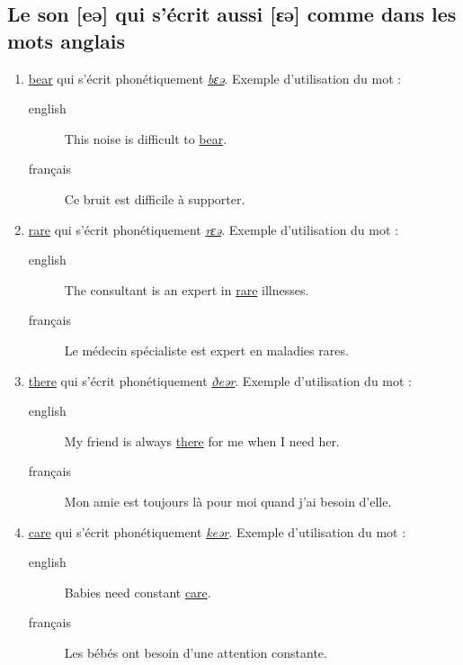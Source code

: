 \subsection{Le son [eə] qui s'écrit aussi [ɛə] comme dans les mots anglais}
\label{sec:org0206cfe}
\begin{enumerate}
\item \href{http://www.wordreference.com/enfr/bear}{bear} qui s'écrit phonétiquement \href{https://dictionary.cambridge.org/dictionary/english/bear}{\emph{bɛə}}. Exemple d'utilisation du mot :
\begin{description}
\item[{english}] \textenglish{This noise is difficult to \href{https://youtu.be/NJ6jv\_lPBN8}{bear}.}
\item[{français}] Ce bruit est difficile à supporter.
\end{description}
\item \href{http://www.wordreference.com/enfr/rare}{rare} qui s'écrit phonétiquement \href{https://dictionary.cambridge.org/dictionary/english/rare}{\emph{rɛə}}. Exemple d'utilisation du mot :
\begin{description}
\item[{english}] \textenglish{The consultant is an expert in \href{https://youtu.be/hPncU3924fU}{rare} illnesses.}
\item[{français}] Le médecin spécialiste est expert en maladies rares.
\end{description}
\item \href{http://www.wordreference.com/enfr/there}{there} qui s'écrit phonétiquement \href{https://dictionary.cambridge.org/dictionary/english/there}{\emph{ðeər}}. Exemple d'utilisation du mot :
\begin{description}
\item[{english}] \textenglish{My friend is always \href{https://youtu.be/fg9pkAYvrSM}{there} for me when I need her.}
\item[{français}] Mon amie est toujours là pour moi quand j'ai besoin
d'elle.
\end{description}
\item \href{http://www.wordreference.com/enfr/care}{care} qui s'écrit phonétiquement \href{https://dictionary.cambridge.org/dictionary/english/care}{\emph{keər}}. Exemple d'utilisation du mot :
\begin{description}
\item[{english}] \textenglish{Babies need constant \href{https://youtu.be/ClrSEz\_tBZw}{care}.}
\item[{français}] Les bébés ont besoin d'une attention constante.
\end{description}
\end{enumerate}